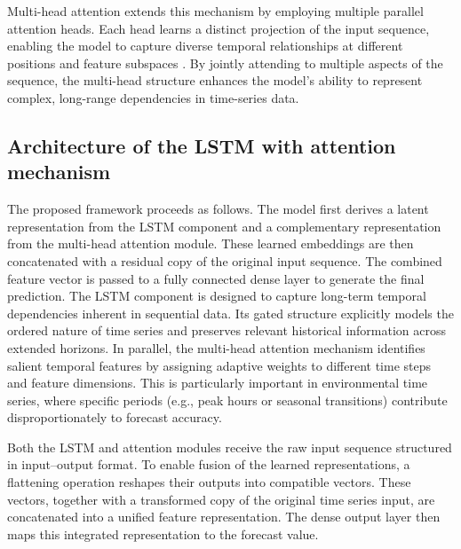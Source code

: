 \documentclass[a4paper,fleqn]{cas-sc}
\begin{document}
Multi-head attention extends this mechanism by employing multiple parallel attention heads. Each head learns a distinct projection of the input sequence, enabling the model to capture diverse temporal relationships at different positions and feature subspaces \cite{li2018multi}. By jointly attending to multiple aspects of the sequence, the multi-head structure enhances the model’s ability to represent complex, long-range dependencies in time-series data.


\subsection{Architecture of the LSTM with attention mechanism}
The proposed framework proceeds as follows. The model first derives a latent representation from the LSTM component and a complementary representation from the multi-head attention module. These learned embeddings are then concatenated with a residual copy of the original input sequence. The combined feature vector is passed to a fully connected dense layer to generate the final prediction.
The LSTM component is designed to capture long-term temporal dependencies inherent in sequential data. Its gated structure explicitly models the ordered nature of time series and preserves relevant historical information across extended horizons. In parallel, the multi-head attention mechanism identifies salient temporal features by assigning adaptive weights to different time steps and feature dimensions. This is particularly important in environmental time series, where specific periods (e.g., peak hours or seasonal transitions) contribute disproportionately to forecast accuracy.

Both the LSTM and attention modules receive the raw input sequence structured in input–output format. To enable fusion of the learned representations, a flattening operation reshapes their outputs into compatible vectors. These vectors, together with a transformed copy of the original time series input, are concatenated into a unified feature representation. The dense output layer then maps this integrated representation to the forecast value.
\end{document}

